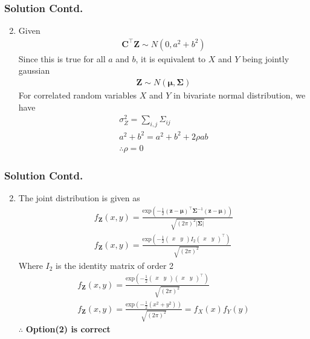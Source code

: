 \documentclass{beamer}
\providecommand{\brak}[1]{\ensuremath{\left(#1\right)}}
\providecommand{\abs}[1]{\vert#1\vert}
\begin{document}
 \begin{frame}
 \frametitle{Solution Contd.}
\begin{enumerate}
\setcounter{enumi}{1}
\item
Given
\begin{align}
\boldsymbol{C^\top Z}\sim N\brak{0,a^2+b^2}
\end{align}
Since this is true for all $a$ and $b$, it is equivalent to $X$ and $Y$ being jointly gaussian
\begin{align}
\boldsymbol{Z}\sim N(\boldsymbol{\mu},\boldsymbol{\Sigma})
\end{align}
For correlated random variables $X$ and $Y$ in bivariate normal distribution, we have
\begin{align}
\sigma_{Z}^2=\displaystyle\sum_{i,j}\Sigma_{ij}\\
a^2+b^2=a^2+b^2+2\rho ab\\
\therefore \rho=0\label{eq:rho}
\end{align}
\end{enumerate}
 \end{frame}

\begin{frame}
 \frametitle{Solution Contd.}
\begin{enumerate}
\setcounter{enumi}{1}
\item
The joint distribution is given as
\begin{align}
f_{\boldsymbol{Z}}(x,y)=\frac{\text{exp}\brak{-\frac{1}{2}\brak{\boldsymbol{z-\mu}}^\top\boldsymbol{\Sigma}^{-1}\brak{\boldsymbol{z-\mu}}}}{\sqrt{(2\pi)^2\abs{\boldsymbol{\Sigma}}}}\\
f_{\boldsymbol{Z}}(x,y)=\frac{\text{exp}\brak{-\frac{1}{2}{\begin{pmatrix} x &y\end{pmatrix}} I_2{\begin{pmatrix} x &y\end{pmatrix}}^\top}}{\sqrt{(2\pi)^2}}
\end{align}
Where $I_2$ is the identity matrix of order 2
\begin{align}
f_{\boldsymbol{Z}}(x,y)=\frac{\text{exp}\brak{-\frac{1}{2}{\begin{pmatrix} x &y\end{pmatrix}} {\begin{pmatrix} x &y\end{pmatrix}}^\top}}{\sqrt{(2\pi)^2}}\\
f_{\boldsymbol{Z}}(x,y)=\frac{\text{exp}\brak{-\frac{1}{2}\brak{x^2+y^2}}}{\sqrt{(2\pi)^2}}=f_X(x)f_Y(y)
\end{align}
$\therefore$ \textbf{Option(2) is correct}
\end{enumerate}
\end{frame}
\end{document}
